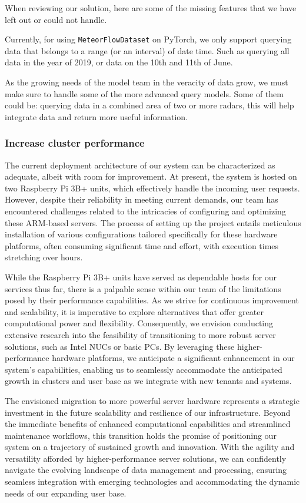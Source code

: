 When reviewing our solution, here are some of the missing features that we have
left out or could not handle.

Currently, for using \texttt{MeteorFlowDataset} on PyTorch, we only support
querying data that belongs to a range (or an interval) of date time. Such as
querying all data in the year of 2019, or data on the 10th and 11th of June.

As the growing needs of the model team in the veracity of data grow, we must
make sure to handle some of the more advanced query models. Some of them could
be: querying data in a combined area of two or more radars, this will help
integrate data and return more useful information.



\subsubsection{Increase cluster performance}
The current deployment architecture of our system can be characterized as
adequate, albeit with room for improvement. At present, the system is hosted on
two Raspberry Pi 3B+ units, which effectively handle the incoming user requests.
However, despite their reliability in meeting current demands, our team has
encountered challenges related to the intricacies of configuring and optimizing
these ARM-based servers. The process of setting up the project entails
meticulous installation of various configurations tailored specifically for
these hardware platforms, often consuming significant time and effort, with
execution times stretching over hours.

While the Raspberry Pi 3B+ units have served as dependable hosts for our
services thus far, there is a palpable sense within our team of the limitations
posed by their performance capabilities. As we strive for continuous improvement
and scalability, it is imperative to explore alternatives that offer greater
computational power and flexibility. Consequently, we envision conducting
extensive research into the feasibility of transitioning to more robust server
solutions, such as Intel NUCs or basic PCs. By leveraging these
higher-performance hardware platforms, we anticipate a significant enhancement
in our system's capabilities, enabling us to seamlessly accommodate the
anticipated growth in clusters and user base as we integrate with new tenants
and systems.

The envisioned migration to more powerful server hardware represents a strategic
investment in the future scalability and resilience of our infrastructure.
Beyond the immediate benefits of enhanced computational capabilities and
streamlined maintenance workflows, this transition holds the promise of
positioning our system on a trajectory of sustained growth and innovation. With
the agility and versatility afforded by higher-performance server solutions, we
can confidently navigate the evolving landscape of data management and
processing, ensuring seamless integration with emerging technologies and
accommodating the dynamic needs of our expanding user base.

